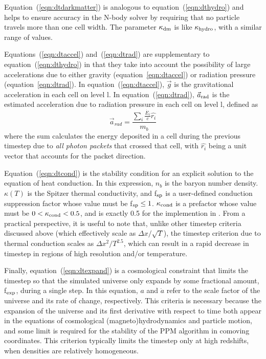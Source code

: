 Equation~(\ref{eqn:dtdarkmatter}) is analogous to
equation~(\ref{eqn:dthydro}) and helps to ensure accuracy in the N-body solver
by requiring that no particle travels more than one cell
width.  The parameter $\kappa_{\rm dm}$ is like $\kappa_{\rm
hydro}$, with a similar range of values.

Equations~(\ref{eqn:dtaccel}) and~(\ref{eqn:dtrad}) are supplementary to equation~(\ref{eqn:dthydro}) in that they
take into account the possibility of large accelerations due to either
gravity (equation~\ref{eqn:dtaccel}) or radiation pressure
(equation~\ref{eqn:dtrad}).  In equation~(\ref{eqn:dtaccel}), $\vec{g}$ is the
gravitational acceleration in each cell on level l.  In
equation~(\ref{eqn:dtrad}), $\vec{a}_{\rm rad}$ is the estimated
acceleration due to radiation pressure in each cell on level l,
defined as
\begin{equation}
\vec{a}_{rad} = \frac{ \sum_i \frac{\dot{E_i}}{c} \hat{r_i} }{m_b} 
\end{equation}
where the sum calculates the energy deposited in a cell during the
previous timestep due to \textit{all photon packets} that crossed that
cell, with $\hat{r_i}$ being a unit vector that accounts for the
packet direction.

Equation~(\ref{eqn:dtcond}) is the stability condition for an explicit
solution to the equation of heat conduction.  In this expression,
$n_b$ is the baryon number density. 
$\kappa(T)$ is the Spitzer thermal conductivity, and f$_{\rm sp}$ is a user-defined
conduction suppression factor whose value must be f$_{\rm sp} \leq 1$.  
$\kappa_{\rm cond}$ is a prefactor whose
value must be $0 < \kappa_{\rm cond}  < 0.5$, and is exactly 0.5 for the
implemention in \enzo.
From a practical
perspective, it is useful to note that, unlike other timestep criteria
discussed above (which effectively scale as $\Delta x / \sqrt{T}$),
the timestep criterion due to thermal conduction scales as $\Delta x^2
/ T^{2.5}$, which can result in a rapid decrease in timestep in
regions of high resolution and/or temperature.

Finally, equation~(\ref{eqn:dtexpand}) is a cosmological constraint that
limits the timestep so that the simulated universe only expands by
some fractional amount, f$_{\rm exp}$, during a single step.  In this
equation, $a$ and $\dot{a}$ refer to the scale factor of the universe
and its rate of change, respectively.  This criteria is necessary
because the expansion of the universe and its first derivative with
respect to time both appear in the equations of cosmological
(magneto)hydrodynamics and particle motion, and some limit is required
for the stability of the PPM algorithm in comoving coordinates.  This
criterion typically limits the timestep
only at high redshifts, when densities are relatively homogeneous.

